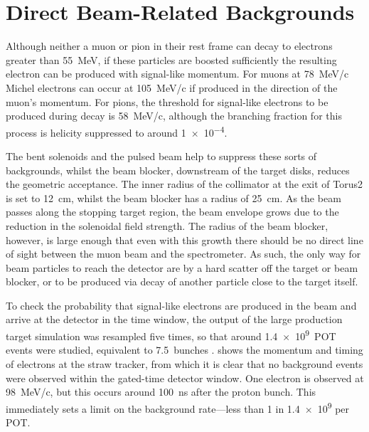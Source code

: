 \section{Direct Beam-Related Backgrounds}
Although neither a muon or pion in their rest frame can decay to electrons greater than 55~MeV, if these particles are boosted sufficiently the resulting electron can be produced with signal-like momentum.
For muons at 78~MeV/c Michel electrons can occur at 105~MeV/c if produced in the direction of the muon's momentum.
For pions, the threshold for signal-like electrons to be produced during decay is 58~MeV/c, although the branching fraction for this process is helicity suppressed to around \num{1e-4}.

The bent solenoids and the pulsed beam help to suppress these sorts of backgrounds, whilst the beam blocker, downstream of the target disks, reduces the geometric acceptance.
The inner radius of the collimator at the exit of Torus2 is set to 12~cm, whilst the beam blocker has a radius of 25~cm. 
As the beam passes along the stopping target region, the beam envelope grows due to the reduction in the solenoidal field strength.
The radius of the beam blocker, however, is large enough that even with this growth there should be no direct line of sight between the muon beam and the spectrometer.
As such, the only way for beam particles to reach the detector are by a hard scatter off the target or beam blocker, or to be produced via decay of another particle close to the target itself.

To check the probability that signal-like electrons are produced in the beam and arrive at the detector in the time window,
the output of the large production target simulation was resampled five times, so that around \num{1.4e9}~\ac{POT} events were studied, equivalent to 7.5~\phaseII bunches .
 shows the momentum and timing of electrons at the straw tracker, from which it is clear that no background events were observed within the gated-time detector window.
One electron is observed at 98~MeV/c, but this occurs around 100~ns after the proton bunch.
This immediately sets a limit on the background rate---less than 1 in \num{1.4e9} per POT.
\FigBgBeamMomVsTime

